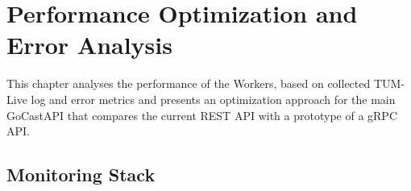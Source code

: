 
\chapter{Performance Optimization and Error Analysis}\label{chapter:optimization_and_alternative_technologies}

This chapter analyses the performance of the Workers, based on collected TUM-Live log and error metrics and presents an optimization approach for the main GoCast\ac{API} that compares the current \ac{REST} \ac{API} with a prototype of a \ac{gRPC} \ac{API}.   

\section{Monitoring Stack}

